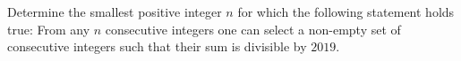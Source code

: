 Determine the smallest positive integer $n$ for which the following statement holds true: From any $n$ consecutive integers one can select a non-empty set of consecutive integers such that their sum is divisible by $2019$.